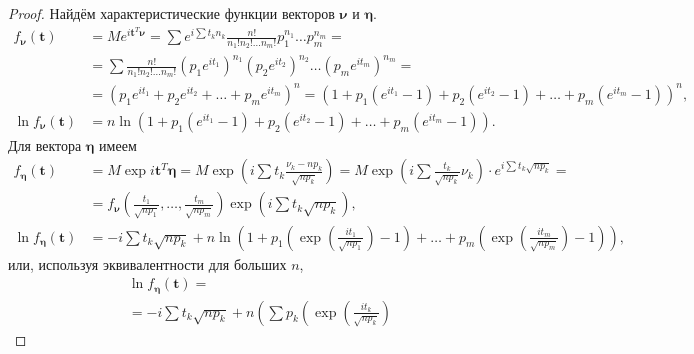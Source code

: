 \begin{proof}
  Найдём характеристические функции векторов $ \bm\nu $ и $ \bm\eta $.
  \begin{align*}
    f_{\bm \nu} (\mathbf t) &= M e^{i \mathbf t^T \bm \nu} =
    \sum e^{i \sum t_k n_k} \frac{n!}{n_1! n_2! \ldots n_m!} p_1^{n_1} \ldots p_m^{n_m} = \\
                          &= \sum \frac{n!}{n_1! n_2! \ldots n_m!} (p_1 e^{i
                          t_1})^{n_1} (p_2 e^{i t_2})^{n_2} \ldots (p_m e^{i
                          t_m})^{n_m} =\\
                          &=(p_1 e^{i t_1} + p_2 e^{i t_2} + \ldots + p_m e^{i t_m})^n
    = (1 + p_1 (e^{i t_1} - 1) + p_2 (e^{i t_2} - 1) + \ldots + p_m (e^{i t_m} -
    1))^n,\\
    \ln f_{\bm \nu} (\mathbf t) &= n \ln (1 + p_1 (e^{i t_1} - 1) + p_2 (e^{i t_2}
    - 1) + \ldots + p_m (e^{i t_m} - 1)).
  \end{align*}
  Для вектора $ \bm\eta $ имеем
  \begin{align*}
    f_{\bm \eta} (\mathbf t) &= M \exp{i \mathbf t^T \bm\eta} =
    M \exp \left(i \sum t_k \frac{\nu_k - np_k}{\sqrt{np_k}}\right) = 
    M \exp \left(i \sum \frac{t_k}{\sqrt{np_k}} \nu_k\right) \cdot e^{i \sum t_k
    \sqrt{np_k}} =\\
                           &=f_{\bm \nu} \left(\frac{t_1}{\sqrt{np_1}}, \dots, \frac{t_m}{\sqrt{np_m}}\right)
    \exp\left(i
    \sum t_k \sqrt{np_k}\right),\\
    \ln f_{\bm \eta} (\mathbf t) &= -i \sum t_k \sqrt{np_k} + n \ln \left(1+p_1
    \left(\exp\left(\frac{i t_1}{\sqrt{np_1}}\right) - 1\right)+ \dots + p_m \left(\exp\left(\frac{i
    t_m}{\sqrt{np_m}}\right) - 1\right) \right),
  \end{align*}
  или, используя эквивалентности для больших $ n $,
  \begin{multline*}
    \ln f_{\bm\eta}(\mathbf t) =\\= -i \sum t_k \sqrt{np_k} + n \left( \sum p_k
      \left(\exp\left(\frac{i t_k}{\sqrt{np_k}}\right)

\end{multline*}
\end{proof}
